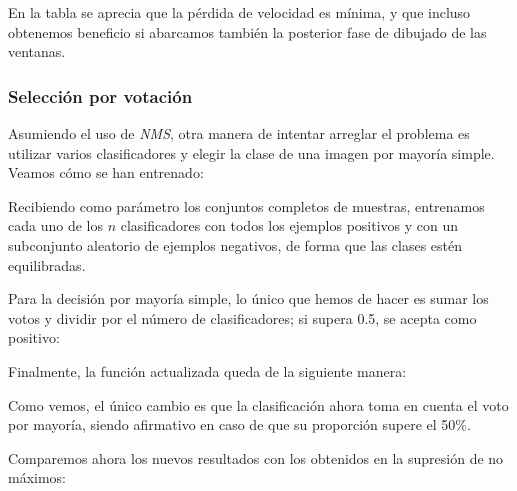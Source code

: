 \documentclass[11pt,a4paper]{article}
\begin{document}
                \par
                En la tabla se aprecia que la pérdida de velocidad es mínima, y que incluso obtenemos beneficio si abarcamos también la posterior fase de dibujado de las ventanas.

            \subsubsection{Selección por votación}

                \par
                Asumiendo el uso de \textit{NMS}, otra manera de intentar arreglar el problema es utilizar varios clasificadores y elegir la clase de una imagen por mayoría simple. Veamos cómo se han entrenado:


                \par
                Recibiendo como parámetro los conjuntos completos de muestras, entrenamos cada uno de los $n$ clasificadores con todos los ejemplos positivos y con un subconjunto aleatorio de ejemplos negativos, de forma que las clases estén equilibradas.

                \par
                Para la decisión por mayoría simple, lo único que hemos de hacer es sumar los votos y dividir por el número de clasificadores; si supera 0.5, se acepta como positivo:


                \par
                Finalmente, la función actualizada queda de la siguiente manera:


                \par
                Como vemos, el único cambio es que la clasificación ahora toma en cuenta el voto por mayoría, siendo afirmativo en caso de que su proporción supere el 50\%.

                \par
                Comparemos ahora los nuevos resultados con los obtenidos en la supresión de no máximos:
\end{document}
